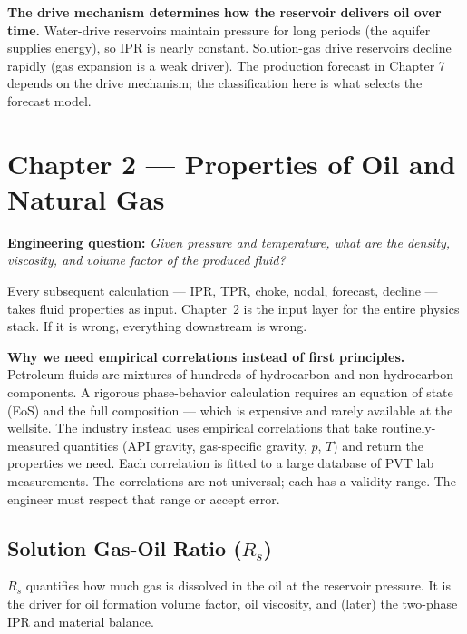 \documentclass[11pt,a4paper,openany]{book}
\begin{document}
\begin{theory}
\textbf{The drive mechanism determines how the reservoir delivers oil
over time.} Water-drive reservoirs maintain pressure for long periods
(the aquifer supplies energy), so IPR is nearly constant. Solution-gas
drive reservoirs decline rapidly (gas expansion is a weak driver). The
production forecast in Chapter 7 depends on the drive mechanism; the
classification here is what selects the forecast model.
\end{theory}

\chapter{Chapter 2 — Properties of Oil and Natural Gas}

\begin{purpose}
\textbf{Engineering question:} \emph{Given pressure and temperature,
what are the density, viscosity, and volume factor of the produced
fluid?}

Every subsequent calculation — IPR, TPR, choke, nodal, forecast,
decline — takes fluid properties as input. Chapter~2 is the input
layer for the entire physics stack. If it is wrong, everything
downstream is wrong.
\end{purpose}

\begin{theory}
\textbf{Why we need empirical correlations instead of first
principles.} Petroleum fluids are mixtures of hundreds of hydrocarbon
and non-hydrocarbon components. A rigorous phase-behavior calculation
requires an equation of state (EoS) and the full composition — which
is expensive and rarely available at the wellsite. The industry
instead uses empirical correlations that take routinely-measured
quantities (API gravity, gas-specific gravity, $p$, $T$) and return
the properties we need. Each correlation is fitted to a large database
of PVT lab measurements. The correlations are not universal; each has
a validity range. The engineer must respect that range or accept error.
\end{theory}

\section{Solution Gas-Oil Ratio ($R_s$)}

\begin{purpose}
$R_s$ quantifies how much gas is dissolved in the oil at the reservoir
pressure. It is the driver for oil formation volume factor, oil
viscosity, and (later) the two-phase IPR and material balance.
\end{purpose}
\end{document}
